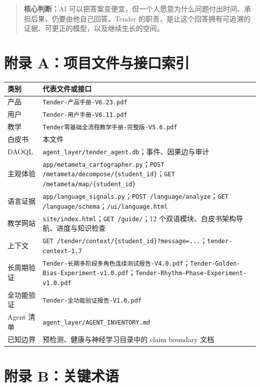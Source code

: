 \documentclass[UTF8,a4paper,11pt]{ctexart}
\newcommand{\keypoint}[1]{\begin{quote}\noindent\textbf{\color{TenderBlue}核心判断：}#1\end{quote}}
\begin{document}
\keypoint{AI 可以把答案变便宜，但一个人愿意为什么问题付出时间、承担后果，仍要由他自己回答。Tender 的职责，是让这个回答拥有可追溯的证据、可更正的模型，以及继续生长的空间。}

\newpage
\appendix
\section{附录 A：项目文件与接口索引}

\begin{center}
\begin{longtable}{@{}p{4.2cm}p{8.8cm}@{}}
\toprule
\textbf{类别} & \textbf{代表文件或接口} \\
\midrule
产品 & \texttt{Tender-产品手册-V6.23.pdf} \\
用户 & \texttt{Tender-用户手册-V6.11.pdf} \\
教学 & \texttt{Tender零基础全流程教学手册-完整版-V5.6.pdf} \\
白皮书 & 本文件 \\
DAOQL & \texttt{agent\_layer/tender\_agent.db}；事件、因果边与审计 \\
主观体验 & \texttt{app/metameta\_cartographer.py}；\texttt{POST /metameta/decompose/\{student\_id\}}；\texttt{GET /metameta/map/\{student\_id\}} \\
语言证据 & \texttt{app/language\_signals.py}；\texttt{POST /language/analyze}；\texttt{GET /language/schema}；\texttt{/ui/language.html} \\
教学网站 & \texttt{site/index.html}；\texttt{GET /guide/}；12 个双语模块、白皮书架构导航、进度与知识检查 \\
上下文 & \texttt{GET /tender/context/\{student\_id\}?message=...}；\texttt{tender-context-1.7} \\
长周期验证 & \texttt{Tender-长期多阶段多角色连续测试报告-V4.0.pdf}；\texttt{Tender-Golden-Bias-Experiment-v1.0.pdf}；\texttt{Tender-Rhythm-Phase-Experiment-v1.0.pdf} \\
全功能验证 & \texttt{Tender-全功能验证报告-V1.0.pdf} \\
Agent 清单 & \texttt{agent\_layer/AGENT\_INVENTORY.md} \\
已知边界 & 预检测、健康与神经学习目录中的 claim boundary 文档 \\
\bottomrule
\end{longtable}
\end{center}

\section{附录 B：关键术语}
\end{document}
